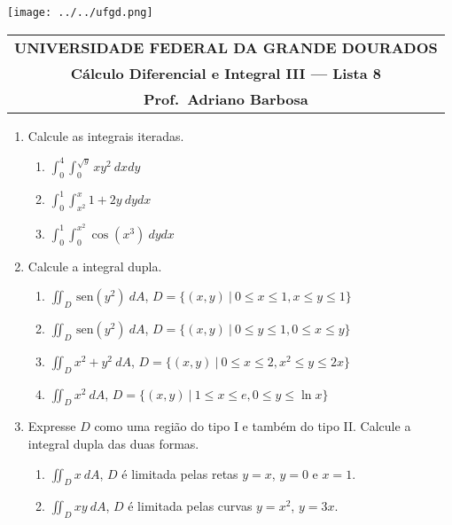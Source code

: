 \documentclass[a4paper,5pt]{amsbook}
\newcommand{\sen}{\,\mbox{sen}}
\newcommand{\ds}{\displaystyle}
\begin{document}
\thispagestyle{empty}
\pagestyle{empty}
\begin{minipage}[h]{0.14\textwidth}
	\texttt{[image: ../../ufgd.png]}
\end{minipage}
\begin{minipage}[h]{\textwidth}
\begin{tabular}{c}
{{\bf UNIVERSIDADE FEDERAL DA GRANDE DOURADOS}}\\
{{\bf C\'alculo Diferencial e Integral III --- Lista 8}}\\
{{\bf Prof.\ Adriano Barbosa}}\\
\end{tabular}
\vspace{-0.45cm}
%
\end{minipage}


\vspace{1cm}
\begin{enumerate}
    \setlength\itemsep{0.5cm}
    \item Calcule as integrais iteradas.
        \begin{enumerate}
            \setlength\itemsep{0.3cm}
            \item $\ds\int_0^4\int_0^{\sqrt{y}} xy^2\ dxdy$
            \item $\ds\int_0^1\int_{x^2}^x 1+2y\ dydx$
            \item $\ds\int_0^1\int_0^{x^2} \cos{(x^3)}\ dydx$
        \end{enumerate}

    \item Calcule a integral dupla.
        \begin{enumerate}
            \setlength\itemsep{0.3cm}
            \item $\ds\iint_D \sen{(y^2)}\ dA$, $D=\{(x,y)\ |\ 0\le x\le 1, x\le
            y\le 1\}$
            \item $\ds\iint_D \sen{(y^2)}\ dA$, $D=\{(x,y)\ |\ 0\le y\le 1,
            0\le x\le y\}$
            \item $\ds\iint_D x^2+y^2\ dA$, $D=\{(x,y)\ |\ 0\le x\le 2, x^2\le
            y\le 2x\}$
            \item $\ds\iint_D x^2\ dA$, $D=\{(x,y)\ |\ 1\le x\le e, 0\le y\le
            \ln{x}\}$
        \end{enumerate}

    \item Expresse $D$ como uma regi\~ao do tipo I e tamb\'em do tipo II. Calcule a
    integral dupla das duas formas.
        \begin{enumerate}
            \setlength\itemsep{0.3cm}
            \item $\ds\iint_D x\ dA$, $D$ \'e limitada pelas retas $y=x$, $y=0$ e
            $x=1$.
            \item $\ds\iint_D xy\ dA$, $D$ \'e limitada pelas curvas $y=x^2$,
            $y=3x$.
        \end{enumerate}
\end{enumerate}
\end{document}
